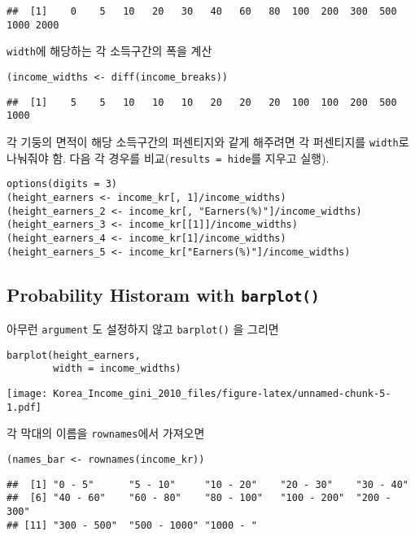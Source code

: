 \documentclass[
]{article}
\begin{document}
\begin{verbatim}
##  [1]    0    5   10   20   30   40   60   80  100  200  300  500 1000 2000
\end{verbatim}

\texttt{width}에 해당하는 각 소득구간의 폭을 계산

\begin{verbatim}
(income_widths <- diff(income_breaks))
\end{verbatim}

\begin{verbatim}
##  [1]    5    5   10   10   10   20   20   20  100  100  200  500 1000
\end{verbatim}

각 기둥의 면적이 해당 소득구간의 퍼센티지와 같게 해주려면 각 퍼센티지를
\texttt{width}로 나눠줘야 함. 다음 각 경우를
비교(\texttt{results\ =\ \textquotesingle{}hide\textquotesingle{}}를
지우고 실행).

\begin{verbatim}
options(digits = 3)
(height_earners <- income_kr[, 1]/income_widths)
(height_earners_2 <- income_kr[, "Earners(%)"]/income_widths)
(height_earners_3 <- income_kr[[1]]/income_widths)
(height_earners_4 <- income_kr[1]/income_widths)
(height_earners_5 <- income_kr["Earners(%)"]/income_widths)
\end{verbatim}

\hypertarget{probability-historam-with-barplot}{%
\subsection{\texorpdfstring{Probability Historam with
\texttt{barplot()}}{Probability Historam with barplot()}}\label{probability-historam-with-barplot}}

아무런 \texttt{argument} 도 설정하지 않고 \texttt{barplot()} 을 그리면

\begin{verbatim}
barplot(height_earners, 
        width = income_widths)
\end{verbatim}

\texttt{[image: Korea\_Income\_gini\_2010\_files/figure-latex/unnamed-chunk-5-1.pdf]}

각 막대의 이름을 \texttt{rownames}에서 가져오면

\begin{verbatim}
(names_bar <- rownames(income_kr))
\end{verbatim}

\begin{verbatim}
##  [1] "0 - 5"      "5 - 10"     "10 - 20"    "20 - 30"    "30 - 40"   
##  [6] "40 - 60"    "60 - 80"    "80 - 100"   "100 - 200"  "200 - 300" 
## [11] "300 - 500"  "500 - 1000" "1000 - "
\end{verbatim}
\end{document}
